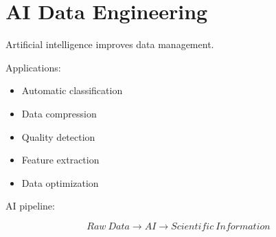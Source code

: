 \section{AI Data Engineering}


Artificial intelligence improves data management.



Applications:


\begin{itemize}

\item Automatic classification

\item Data compression

\item Quality detection

\item Feature extraction

\item Data optimization

\end{itemize}



AI pipeline:


\[
Raw\ Data
\rightarrow
AI
\rightarrow
Scientific\ Information
\]

